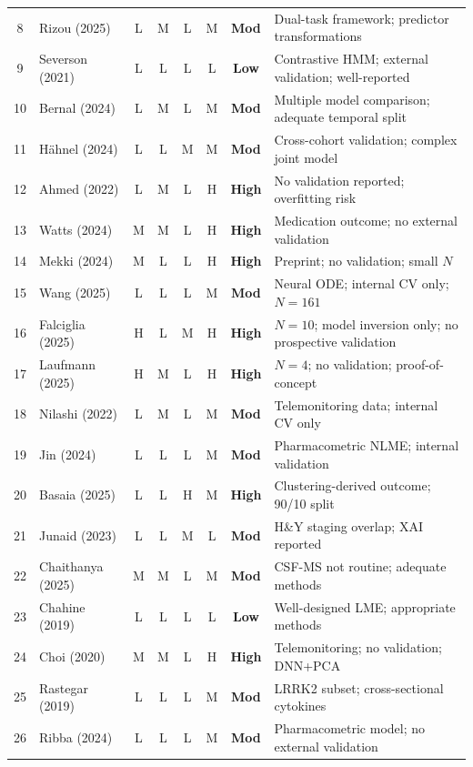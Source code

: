 \documentclass[11pt,a4paper]{article}
\begin{document}
\begin{landscape}
\begin{small}
\begin{longtable}{@{}clcccccp{5.5cm}@{}}
8  & Rizou (2025)      & L & M & L & M & \textbf{Mod} & Dual-task framework; predictor transformations \\
9  & Severson (2021)   & L & L & L & L & \textbf{Low} & Contrastive HMM; external validation; well-reported \\
10 & Bernal (2024)     & L & M & L & M & \textbf{Mod} & Multiple model comparison; adequate temporal split \\
11 & H\"ahnel (2024)   & L & L & M & M & \textbf{Mod} & Cross-cohort validation; complex joint model \\
12 & Ahmed (2022)      & L & M & L & H & \textbf{High} & No validation reported; overfitting risk \\
13 & Watts (2024)      & M & M & L & H & \textbf{High} & Medication outcome; no external validation \\
14 & Mekki (2024)      & M & L & L & H & \textbf{High} & Preprint; no validation; small $N$ \\
15 & Wang (2025)       & L & L & L & M & \textbf{Mod} & Neural ODE; internal CV only; $N=161$ \\
16 & Falciglia (2025)  & H & L & M & H & \textbf{High} & $N=10$; model inversion only; no prospective validation \\
17 & Laufmann (2025)   & H & M & L & H & \textbf{High} & $N=4$; no validation; proof-of-concept \\
18 & Nilashi (2022)    & L & M & L & M & \textbf{Mod} & Telemonitoring data; internal CV only \\
19 & Jin (2024)        & L & L & L & M & \textbf{Mod} & Pharmacometric NLME; internal validation \\
20 & Basaia (2025)     & L & L & H & M & \textbf{High} & Clustering-derived outcome; 90/10 split \\
21 & Junaid (2023)     & L & L & M & L & \textbf{Mod} & H\&Y staging overlap; XAI reported \\
22 & Chaithanya (2025) & M & M & L & M & \textbf{Mod} & CSF-MS not routine; adequate methods \\
23 & Chahine (2019)    & L & L & L & L & \textbf{Low} & Well-designed LME; appropriate methods \\
24 & Choi (2020)       & M & M & L & H & \textbf{High} & Telemonitoring; no validation; DNN+PCA \\
25 & Rastegar (2019)   & L & L & L & M & \textbf{Mod} & LRRK2 subset; cross-sectional cytokines \\
26 & Ribba (2024)      & L & L & L & M & \textbf{Mod} & Pharmacometric model; no external validation \\

\end{longtable}
\end{small}
\end{landscape}
\end{document}
